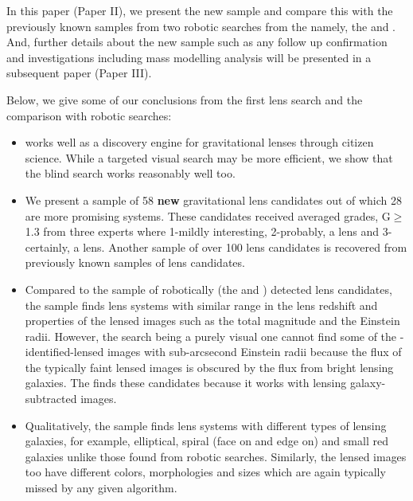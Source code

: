 \documentclass[useAMS,usenatbib,a4paper]{mn2e}
\begin{document}
In this paper (Paper II), we present the new \sw sample and compare this
with the previously known samples from two robotic searches from the
\cfhtls namely, the \rf and \af. And, further details about the new
sample such as any follow up confirmation and investigations including
mass modelling analysis will be presented in a subsequent \sw paper
(Paper III). 

Below, we give some of our conclusions from the first \sw lens search
and the comparison with robotic searches:
\begin{itemize}

\item \sw works well as a discovery engine for gravitational lenses
through citizen science. While a targeted visual search may be more
efficient, we show that the blind search works reasonably well too.

\item We present a sample of 58 {\bf new} gravitational lens candidates
out of which 28 are more promising systems. These candidates received
averaged grades, G$\ge$1.3 from three experts where 1-mildly interesting,
2-probably, a lens and 3-certainly, a lens. Another sample of over 100
lens candidates is recovered from previously known samples of lens
candidates.


\item Compared to the sample of robotically (the \rf and \af) detected
lens candidates, the \sw sample finds lens systems with similar range in
the lens redshift and properties of the lensed images such as the total
magnitude and the Einstein radii. However, the \sw search being a purely
visual one cannot find some of the \rf-identified-lensed images with
sub-arcsecond Einstein radii because the flux of the typically faint
lensed images is obscured by the flux from bright lensing galaxies. The
\rf finds these candidates because it works with lensing
galaxy-subtracted images.

\item Qualitatively, the \sw sample finds lens systems with different
types of lensing galaxies, for example, elliptical, spiral (face on and
edge on) and small red galaxies unlike those found from robotic
searches. Similarly, the lensed images too have different colors,
morphologies and sizes which are again typically missed by any given
algorithm.


\end{itemize}
\end{document}
